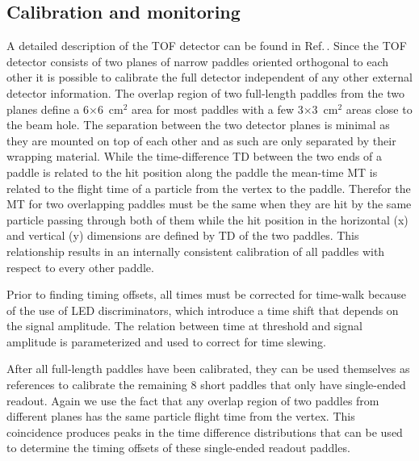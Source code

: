 \subsection{Calibration and monitoring \label{sec:sccalib}}
A detailed description of the TOF detector can be found in Ref.\,\cite{GlueXTOFNIM}. Since the TOF detector consists of two
planes of narrow paddles oriented orthogonal to each other it is possible to calibrate the full detector independent
of any other external detector information. The overlap region of two full-length paddles from the two planes define
a 6$\times$6~cm$^2$ area for most paddles with a few 3$\times$3~cm$^2$ areas close to the beam hole. The separation between
the two detector planes is minimal as they are mounted on top of each other and as such are only separated by their wrapping
material. While the time-difference TD between the two ends of a paddle is related to the hit position along the paddle
the mean-time MT is related to the flight time of a particle from the vertex to the paddle. Therefor the MT for two overlapping
paddles must be the same when they are hit by the same particle passing through both of them while the hit position in the horizontal (x) and vertical (y) dimensions are defined by TD of the two paddles. This relationship results in an internally consistent calibration of all paddles with respect to every other paddle.

Prior to finding timing offsets, all times must be corrected for time-walk because of the use of LED discriminators, which
introduce a time shift that depends on the signal amplitude. The relation between time at threshold and signal amplitude is parameterized and used to correct for time slewing.

After all full-length paddles have been calibrated, they can be used themselves as references to
calibrate the remaining 8 short paddles that only have single-ended readout.  Again we use the fact that any overlap region of two paddles from different
planes has the same particle flight time from the vertex. This coincidence produces peaks in the time difference distributions that can be used to determine the timing offsets of these single-ended readout paddles. 

